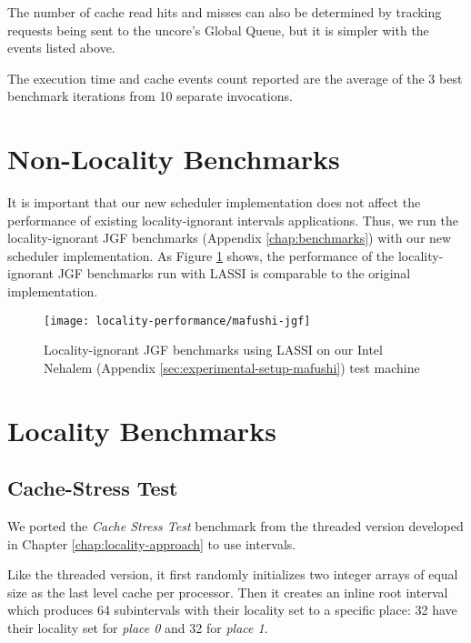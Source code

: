 The number of cache read hits and misses can also be determined by
tracking requests being sent to the uncore's Global Queue, but it is
simpler with the events listed above.

The execution time and cache events count reported are the average of
the 3 best benchmark iterations from 10 separate invocations.


\section{Non-Locality Benchmarks}
\label{sec:locality-performance-non-locality}

It is important that our new scheduler implementation does not affect
the performance of existing locality-ignorant intervals
applications. Thus, we run the locality-ignorant JGF benchmarks
(Appendix \ref{chap:benchmarks}) with our new scheduler
implementation. As Figure \ref{fig:locality-performance-jgf} shows,
the performance of the locality-ignorant JGF benchmarks run with LASSI
is comparable to the original implementation.

\begin{figure}[!ht]
  \centering
  \texttt{[image: locality-performance/mafushi-jgf]}
  \caption[Locality-ignorant JGF benchmarks]{Locality-ignorant JGF
    benchmarks using LASSI on our Intel Nehalem (Appendix
    \ref{sec:experimental-setup-mafushi}) test machine}
  \label{fig:locality-performance-jgf}
\end{figure}


\section{Locality Benchmarks}
\label{sec:locality-performance-locality}

\subsection{Cache-Stress Test}
\label{sec:locality-performance-cache-stress-test}

We ported the \emph{Cache Stress Test} benchmark from the threaded
version developed in Chapter \ref{chap:locality-approach} to use
intervals.

Like the threaded version, it first randomly initializes two integer
arrays of equal size as the last level cache per processor. Then it
creates an inline root interval which produces 64 subintervals with
their locality set to a specific place: 32 have their locality set for
\emph{place 0} and 32 for \emph{place 1}.

